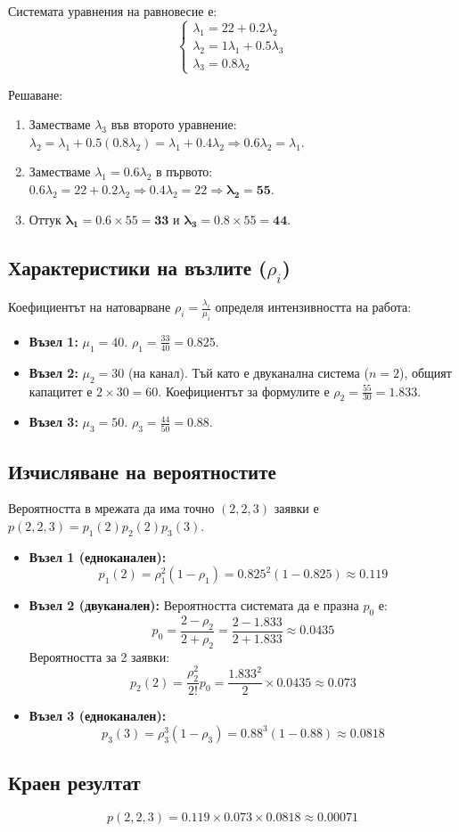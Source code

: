 	Системата уравнения на равновесие е:
	\[
	\begin{cases}
		\lambda_1 = 22 + 0.2\lambda_2 \\
		\lambda_2 = 1\lambda_1 + 0.5\lambda_3 \\
		\lambda_3 = 0.8\lambda_2
	\end{cases}
	\]
	
	Решаване:
	\begin{enumerate}
		\item Заместваме $\lambda_3$ във второто уравнение: $\lambda_2 = \lambda_1 + 0.5(0.8\lambda_2) = \lambda_1 + 0.4\lambda_2 \Rightarrow 0.6\lambda_2 = \lambda_1$.
		\item Заместваме $\lambda_1 = 0.6\lambda_2$ в първото: $0.6\lambda_2 = 22 + 0.2\lambda_2 \Rightarrow 0.4\lambda_2 = 22 \Rightarrow \mathbf{\lambda_2 = 55}$.
		\item Оттук $\mathbf{\lambda_1} = 0.6 \times 55 = \mathbf{33}$ и $\mathbf{\lambda_3} = 0.8 \times 55 = \mathbf{44}$.
	\end{enumerate}
	
	\subsection{Характеристики на възлите ($\rho_i$)}
	Коефициентът на натоварване $\rho_i = \frac{\lambda_i}{\mu_i}$ определя интензивността на работа:
	\begin{itemize}
		\item \textbf{Възел 1:} $\mu_1 = 40$. $\rho_1 = \frac{33}{40} = 0.825$.
		\item \textbf{Възел 2:} $\mu_2 = 30$ (на канал). Тъй като е двуканална система ($n=2$), общият капацитет е $2 \times 30 = 60$. Коефициентът за формулите е $\rho_2 = \frac{55}{30} = 1.833$.
		\item \textbf{Възел 3:} $\mu_3 = 50$. $\rho_3 = \frac{44}{50} = 0.88$.
	\end{itemize}
	
	\subsection{Изчисляване на вероятностите}
	Вероятността в мрежата да има точно $(2, 2, 3)$ заявки е $p(2, 2, 3) = p_1(2)p_2(2)p_3(3)$.
	
	\begin{itemize}
		\item \textbf{Възел 1 (едноканален):}
		\[ p_1(2) = \rho_1^2(1 - \rho_1) = 0.825^2(1 - 0.825) \approx 0.119 \] 
		
		\item \textbf{Възел 2 (двуканален):} Вероятността системата да е празна $p_0$ е:
		\[ p_0 = \frac{2 - \rho_2}{2 + \rho_2} = \frac{2 - 1.833}{2 + 1.833} \approx 0.0435 \] 
		Вероятността за 2 заявки:
		\[ p_2(2) = \frac{\rho_2^2}{2!} p_0 = \frac{1.833^2}{2} \times 0.0435 \approx 0.073 \] 
		
		\item \textbf{Възел 3 (едноканален):}
		\[ p_3(3) = \rho_3^3(1 - \rho_3) = 0.88^3(1 - 0.88) \approx 0.0818 \] 
	\end{itemize}
	
	\subsection{Краен резултат}
	\[ p(2, 2, 3) = 0.119 \times 0.073 \times 0.0818 \approx 0.00071 \] 
	